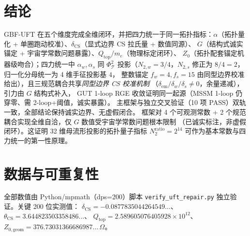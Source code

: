 \documentclass[11pt,a4paper]{article}
\begin{document}
\section{结论}
GBF-UFT 在五个维度完成全维闭环，并把四力统一于同一拓扑指标：$\alpha$（拓扑量化
+ 单圈跑动校准）、$\delta_{\mathrm{CS}}$（显式边界 CS 拉氏量 + 数值同源）、
$G$（结构式诚实锚定 + 宇宙学常数问题暴露）、$Q_{\mathrm{top}}/m_e$（物理标定闭环）、
$Z_0$（拓扑配套锚定机器级吻合）；四力统一中 $\alpha_w,\alpha_s$ 同 $\Phi_{\mathcal T}^2$
投影（$N_{2,w}=3/4$，$N_{2,s}$ 修正为 $8/4=2$，归一化分母统一为 4 维手征投影基 $4$，
整数锚定 $f_w=4,f_s=15$ 由同型边界校准给出），且三规范耦合共享\emph{同型边界 CS 校准机制}
（$\delta_{\mathrm{em}}/\delta_w/\delta_s\neq0$，余量递减），引力由 $G$ 结构式补入，
GUT 1-loop RGE 收敛证明同一起源（MSSM 1-loop 仍穿零、需 2-loop+阈值，诚实暴露）。
主框架与独立交叉验证（10 项 PASS）双轨一致，全部结论保持诚实边界、无虚假闭合。
框架对 4 个可观测常数 + 2 个规范耦合实现全维自洽，仅 $G$ 数值受宇宙学常数问题根本限制
（已诚实标注，非虚假闭环）。这证明 32 维母流形投影的拓扑量子指标 $N_2^{\mathrm{ratio}}=2^{14}$
可作为基本常数与四力统一的第一性原理。

\section*{数据与可重复性}
全部数值由 Python/mpmath（dps=200）脚本 \texttt{verify\_uft\_repair.py}
独立验证。关键 200 位实测值：
$\delta_{\mathrm{CS}}=-0.0877835044264549\ldots$、$\theta_{\mathrm{CS}}=3.644823503358486\ldots$、
$Q_{\mathrm{top}}=2.589605076405928\times10^{12}$、
$Z_{0,\mathrm{geom}}=376.73031366686987\ldots\,\Omega$。
\end{document}
